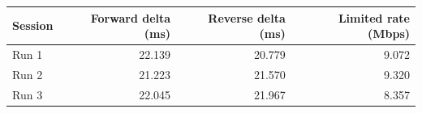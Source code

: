 \begin{table}[H]
\centering
\label{table:network:start}
\begin{tabular}{lrrr}
\toprule
\textbf{Session} & \textbf{Forward delta (ms)} & \textbf{Reverse delta (ms)} & \textbf{Limited rate (Mbps)} \\
\midrule
Run 1 & 22.139 & 20.779 & 9.072 \\
Run 2 & 21.223 & 21.570 & 9.320 \\
Run 3 & 22.045 & 21.967 & 8.357 \\
\bottomrule
\end{tabular}
\label{table:network:end}
\end{table}
